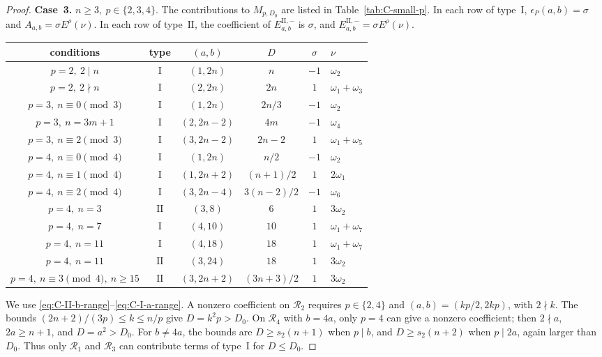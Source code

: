 \documentclass[11pt,a4paper]{amsart}
\theoremstyle{plain}
\numberwithin{equation}{section}
\newenvironment{pf}{\begin{proof}}{\end{proof}}
\begin{document}
\begin{pf}
	\noindent\textbf{Case~3.} \(n\ge3,\ p\in\{2,3,4\}\).
	The contributions to \(M_{p,D_0}\) are listed in Table~\ref{tab:C-small-p}. In each row
	of type~\(\mathrm I\), \(\epsilon_P(a,b)=\sigma\) and
	\(A_{a,b}=\sigma E^\rho(\nu)\). In each row of type~\(\mathrm{II}\),
	the coefficient of \(E_{a,b}^{\mathrm{II},-}\) is \(\sigma\), and
	\(E_{a,b}^{\mathrm{II},-}=\sigma E^\rho(\nu)\).
	\begin{center}
\label{tab:C-small-p}
		\small
		\begin{adjustbox}{max width=\textwidth}
			\begin{tabular}{c|c|c|c|c|l}
				conditions&type&\((a,b)\)&\(D\)&\(\sigma\)&\(\nu\)\\ \hline
				\(p=2,\ 2\mid n\)&\(\mathrm I\)&\((1,2n)\)&\(n\)&\(-1\)&\(\omega_2\)\\
				\(p=2,\ 2\nmid n\)&\(\mathrm I\)&\((2,2n)\)&\(2n\)&\(1\)&\(\omega_1+\omega_3\)\\
				\(p=3,\ n\equiv0\pmod3\)&\(\mathrm I\)&\((1,2n)\)&\(2n/3\)&\(-1\)&\(\omega_2\)\\
				\(p=3,\ n=3m+1\)&\(\mathrm I\)&\((2,2n-2)\)&\(4m\)&\(-1\)&\(\omega_4\)\\
				\(p=3,\ n\equiv2\pmod3\)&\(\mathrm I\)&\((3,2n-2)\)&\(2n-2\)&\(1\)&\(\omega_1+\omega_5\)\\
				\(p=4,\ n\equiv0\pmod4\)&\(\mathrm I\)&\((1,2n)\)&\(n/2\)&\(-1\)&\(\omega_2\)\\
				\(p=4,\ n\equiv1\pmod4\)&\(\mathrm I\)&\((1,2n+2)\)&\((n+1)/2\)&\(1\)&\(2\omega_1\)\\
				\(p=4,\ n\equiv2\pmod4\)&\(\mathrm I\)&\((3,2n-4)\)&\(3(n-2)/2\)&\(-1\)&\(\omega_6\)\\
				\(p=4,\ n=3\)&\(\mathrm{II}\)&\((3,8)\)&\(6\)&\(1\)&\(3\omega_2\)\\
				\(p=4,\ n=7\)&\(\mathrm I\)&\((4,10)\)&\(10\)&\(1\)&\(\omega_1+\omega_7\)\\
				\(p=4,\ n=11\)&\(\mathrm I\)&\((4,18)\)&\(18\)&\(1\)&\(\omega_1+\omega_7\)\\
				\(p=4,\ n=11\)&\(\mathrm{II}\)&\((3,24)\)&\(18\)&\(1\)&\(3\omega_2\)\\
				\(p=4,\ n\equiv3\pmod4,\ n\ge15\)&\(\mathrm{II}\)&\((3,2n+2)\)&\((3n+3)/2\)&\(1\)&\(3\omega_2\)
			\end{tabular}
		\end{adjustbox}
	\end{center}
	
	We use \eqref{eq:C-II-b-range}--\eqref{eq:C-I-a-range}.
	A nonzero coefficient on \(\mathcal R_2\) requires \(p\in\{2,4\}\)
	and \((a,b)=(kp/2,2kp)\), with \(2\nmid k\). The bounds
	\((2n+2)/(3p)\le k\le n/p\) give \(D=k^2p>D_0\).
	On \(\mathcal R_4\) with \(b=4a\), only \(p=4\) can give a
	nonzero coefficient; then \(2\nmid a\), \(2a\ge n+1\), and
	\(D=a^2>D_0\). For \(b\ne4a\), the bounds are
	\(D\ge s_2(n+1)\) when \(p\mid b\), and
	\(D\ge s_2(n+2)\) when \(p\mid2a\), again larger than \(D_0\).
	Thus only \(\mathcal R_1\) and \(\mathcal R_3\) can contribute
	terms of type~\(\mathrm I\) for \(D\le D_0\).
	

\end{pf}
\end{document}
